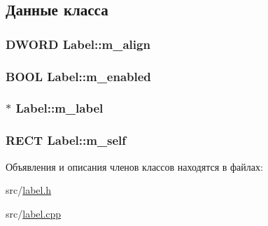 \subsection{Данные класса}
\hypertarget{class_label_ac7c8edd002ef599c40e67831169979f5}{
\subsubsection[{m\-\_\-align}]{\setlength{\rightskip}{0pt plus 5cm}D\-W\-O\-R\-D Label\-::m\-\_\-align\hspace{0.3cm}{\ttfamily [protected]}}}\label{class_label_ac7c8edd002ef599c40e67831169979f5}
\hypertarget{class_label_a6befb7056ad81ff5790b6bd79361f5a1}{
\subsubsection[{m\-\_\-enabled}]{\setlength{\rightskip}{0pt plus 5cm}B\-O\-O\-L Label\-::m\-\_\-enabled\hspace{0.3cm}{\ttfamily [protected]}}}\label{class_label_a6befb7056ad81ff5790b6bd79361f5a1}
\hypertarget{class_label_aaf07c83f98530b3f4094107836540fe7}{
\subsubsection[{m\-\_\-label}]{$\ast$ Label\-::m\-\_\-label\hspace{0.3cm}{\ttfamily [protected]}}}\label{class_label_aaf07c83f98530b3f4094107836540fe7}
\hypertarget{class_label_ac8534cb903d21810c0944c0adaa34a5d}{
\subsubsection[{m\-\_\-self}]{\setlength{\rightskip}{0pt plus 5cm}R\-E\-C\-T Label\-::m\-\_\-self\hspace{0.3cm}{\ttfamily [protected]}}}\label{class_label_ac8534cb903d21810c0944c0adaa34a5d}


Объявления и описания членов классов находятся в файлах\-:\begin{DoxyCompactItemize}
\item 
src/\hyperlink{label_8h}{label.\-h}\item 
src/\hyperlink{label_8cpp}{label.\-cpp}\end{DoxyCompactItemize}
